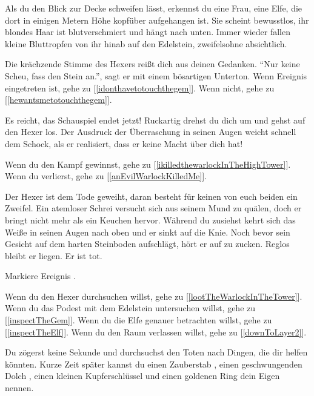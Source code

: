 Als du den Blick zur Decke schweifen lässt, erkennst du eine Frau, eine Elfe, die dort in einigen Metern Höhe kopfüber aufgehangen ist. Sie scheint bewusstlos, ihr blondes Haar ist blutverschmiert und hängt nach unten. Immer wieder fallen kleine Bluttropfen von ihr hinab auf den Edelstein, zweifelsohne absichtlich.

Die krächzende Stimme des Hexers reißt dich aus deinen Gedanken. ``Nur keine Scheu, fass den Stein an.'', sagt er mit einem bösartigen Unterton.
Wenn Ereignis  eingetreten ist, gehe zu [\ref{idonthavetotouchthegem}]. Wenn nicht, gehe zu [\ref{hewantsmetotouchthegem}].


Es reicht, das Schauspiel endet jetzt! Ruckartig drehst du dich um und gehst auf den Hexer los. Der Ausdruck der Überraschung in seinen Augen weicht schnell dem Schock, als er realisiert, dass er keine Macht über dich hat!

\monsterWarlock

Wenn du den Kampf gewinnst, gehe zu [\ref{ikilledthewarlockInTheHighTower}].
Wenn du verlierst, gehe zu [\ref{anEvilWarlockKilledMe}].


Der Hexer ist dem Tode geweiht, daran besteht für keinen von euch beiden ein Zweifel. Ein atemloser Schrei versucht sich aus seinem Mund zu quälen, doch er bringt nicht mehr als ein Keuchen hervor. Während du zusiehst kehrt sich das Weiße in seinen Augen nach oben und er sinkt auf die Knie. Noch bevor sein Gesicht auf dem harten Steinboden aufschlägt, hört er auf zu zucken. Reglos bleibt er liegen. Er ist tot.

Markiere Ereignis .

Wenn du den Hexer durchsuchen willst, gehe zu [\ref{lootTheWarlockInTheTower}].
Wenn du das Podest mit dem Edelstein untersuchen willst, gehe zu [\ref{inspectTheGem}].
Wenn du die Elfe genauer betrachten willst, gehe zu [\ref{inspectTheElf}].
Wenn du den Raum verlassen willst, gehe zu [\ref{downToLayer2}].


Du zögerst keine Sekunde und durchsuchst den Toten nach Dingen, die dir helfen könnten.
Kurze Zeit später kannst du einen Zauberstab , einen geschwungenden Dolch , einen kleinen Kupferschlüssel  und einen goldenen Ring  dein Eigen nennen.

